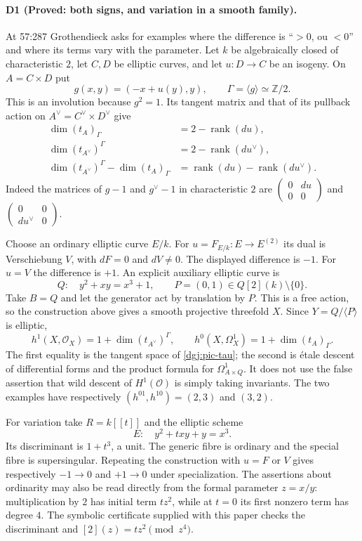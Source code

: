 \paragraph{D1 (Proved: both signs, and variation in a smooth family).}
At 57:287 Grothendieck asks for examples where the difference is
``$>0$, ou $<0$'' and where its terms vary with the parameter.
Let $k$ be algebraically closed of characteristic $2$, let $C,D$ be
elliptic curves, and let $u:D\to C$ be an isogeny.  On $A=C\times D$ put
\[
 g(x,y)=(-x+u(y),y),\qquad \Gamma=\langle g\rangle\simeq\mathbb Z/2.
\]
This is an involution because $g^2=1$.  Its tangent matrix and that of
its pullback action on $A^\vee=C^\vee\times D^\vee$ give
\begin{align*}
 \dim (t_A)_\Gamma&=2-\operatorname{rank}(du),\\
 \dim(t_{A^\vee})^\Gamma&=2-\operatorname{rank}(du^\vee),\\
 \dim(t_{A^\vee})^\Gamma-\dim(t_A)_\Gamma
   &=\operatorname{rank}(du)-\operatorname{rank}(du^\vee).
\end{align*}
Indeed the matrices of $g-1$ and $g^\vee-1$ in characteristic $2$ are
$\left(\begin{smallmatrix}0&du\\0&0\end{smallmatrix}\right)$ and
$\left(\begin{smallmatrix}0&0\\du^\vee&0\end{smallmatrix}\right)$.

Choose an ordinary elliptic curve $E/k$.  For
$u=F_{E/k}:E\to E^{(2)}$ its dual is Verschiebung $V$, with $dF=0$ and
$dV\ne0$.  The displayed difference is $-1$.  For $u=V$ the difference
is $+1$.  An explicit auxiliary elliptic curve is
\[
 Q:\quad y^2+xy=x^3+1,
 \qquad P=(0,1)\in Q[2](k)\setminus\{0\}.
\]
Take $B=Q$ and let the generator act by translation by $P$.  This is a
free action, so the construction above gives a smooth projective
threefold $X$.  Since $Y=Q/\langle P\rangle$ is elliptic,
\[
 h^1(X,\mathcal O_X)=1+\dim(t_{A^\vee})^\Gamma,
 \qquad
 h^0(X,\Omega_X^1)=1+\dim(t_A)_\Gamma.
\]
The first equality is the tangent space of \eqref{dgj:pic-tau}; the
second is étale descent of differential forms and the product formula
for $\Omega^1_{A\times Q}$.  It does not use the false assertion that
wild descent of $H^1(\mathcal O)$ is simply taking invariants.
The two examples have respectively $(h^{01},h^{10})=(2,3)$ and $(3,2)$.

For variation take $R=k[[t]]$ and the elliptic scheme
\begin{equation}\label{dgj:elliptic-family}
 E:\quad y^2+txy+y=x^3.
\end{equation}
Its discriminant is $1+t^3$, a unit.  The generic fibre is ordinary and
the special fibre is supersingular.  Repeating the construction with
$u=F$ or $V$ gives respectively $-1\to0$ and $+1\to0$ under
specialization.  The assertions about ordinarity may also be read
directly from the formal parameter $z=x/y$: multiplication by $2$ has
initial term $tz^2$, while at $t=0$ its first nonzero term has degree
$4$.  The symbolic certificate supplied with this paper checks the
discriminant and $[2](z)=tz^2\pmod {z^4}$.

